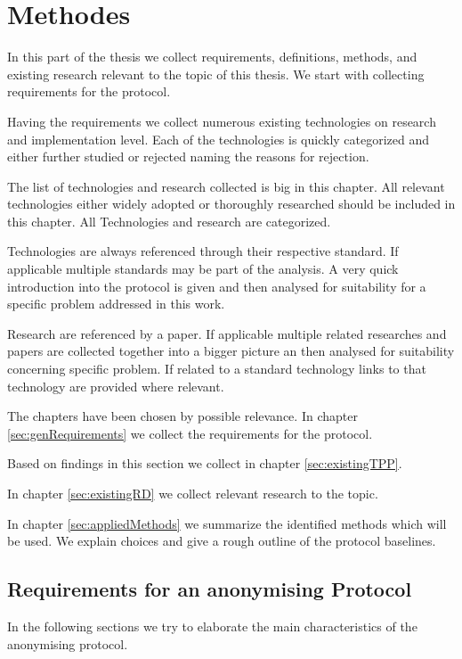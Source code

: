 

\part{Methodes}
In this part of the thesis we collect requirements, definitions, methods, and existing research relevant to the topic of this thesis. We start with collecting requirements for the protocol. 

Having the requirements we collect numerous existing technologies on research and implementation level. Each of the technologies is quickly categorized and either further studied or rejected naming the reasons for rejection.

The list of technologies and research collected is big in this chapter. All relevant technologies either widely adopted or thoroughly researched should be included in this chapter. All Technologies and research are categorized. 

Technologies are always referenced through their respective standard. If applicable multiple standards may be part of the analysis. A very quick introduction into the protocol is given and then analysed for suitability for a specific problem addressed in this work.

Research are referenced by a paper. If applicable multiple related researches and papers are collected together into a bigger picture an then analysed for suitability concerning specific problem. If related to a standard technology links to that technology are provided where relevant.

The chapters have been chosen by possible relevance. In chapter \ref{sec:genRequirements} we collect the requirements for the protocol. 

Based on findings in this section we collect in chapter \ref{sec:existingTPP}. 

In chapter \ref{sec:existingRD} we collect relevant research to the topic. 

In chapter \ref{sec:appliedMethods} we summarize the identified  methods which will be used. We explain choices and give a rough outline of the protocol baselines.

\chapter{Requirements for an anonymising Protocol\label{sec:genRequirements}}
In the following sections we try to elaborate the main characteristics of the anonymising protocol. 

